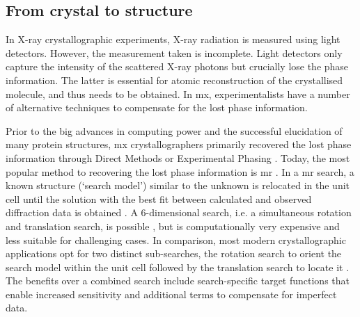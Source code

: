 \subsection{From crystal to structure}
In X-ray crystallographic experiments, X-ray radiation is measured using light detectors. However, the measurement taken is incomplete. Light detectors only capture the intensity of the scattered X-ray photons but crucially lose the phase information. The latter is essential for atomic reconstruction of the crystallised molecule, and thus needs to be obtained. In \gls{mx}, experimentalists have a number of alternative techniques to compensate for the lost phase information. 

Prior to the big advances in computing power and the successful elucidation of many protein structures, \gls{mx} crystallographers primarily recovered the lost phase information through Direct Methods or Experimental Phasing \cite{Rupp2010-nc}. Today, the most popular method to recovering the lost phase information is \gls{mr} \cite{Rossmann2001-yw,Rossmann1990-am}. In a \Gls{mr} search, a known structure (`search model') similar to the unknown is relocated in the unit cell until the solution with the best fit between calculated and observed diffraction data is obtained \cite{Rupp2010-nc}. A 6-dimensional search, i.e. a simultaneous rotation and translation search, is possible \cite{Kissinger1999-ho,Glykos2000-gc,Read2001-nu}, but is computationally very expensive and less suitable for challenging cases. In comparison, most modern crystallographic applications opt for two distinct sub-searches, the rotation search to orient the search model within the unit cell followed by the translation search to locate it \cite{Rupp2010-nc}. The benefits over a combined search include search-specific target functions that enable increased sensitivity and additional terms to compensate for imperfect data. 

